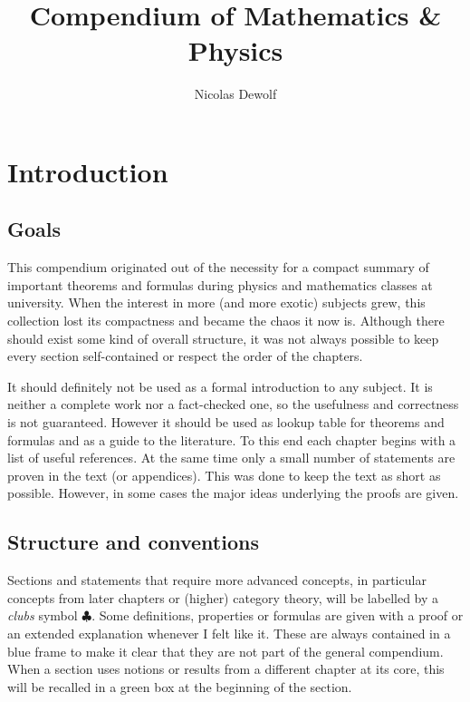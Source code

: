 \documentclass[11pt, a4paper]{report}
\begin{document}
\title{Compendium of Mathematics \& Physics}
\author{Nicolas Dewolf}
\maketitle

\tableofcontents

\chapter{Introduction}
\section{Goals}

    This compendium originated out of the necessity for a compact summary of important theorems and formulas during physics and mathematics classes at university. When the interest in more (and more exotic) subjects grew, this collection lost its compactness and became the chaos it now is. Although there should exist some kind of overall structure, it was not always possible to keep every section self-contained or respect the order of the chapters.

    It should definitely not be used as a formal introduction to any subject. It is neither a complete work nor a fact-checked one, so the usefulness and correctness is not guaranteed. However it should be used as lookup table for theorems and formulas and as a guide to the literature. To this end each chapter begins with a list of useful references. At the same time only a small number of statements are proven in the text (or appendices). This was done to keep the text as short as possible. However, in some cases the major ideas underlying the proofs are given.

\section{Structure and conventions}

    Sections and statements that require more advanced concepts, in particular concepts from later chapters or (higher) category theory, will be labelled by a \textit{clubs} symbol $\clubsuit$. Some definitions, properties or formulas are given with a proof or an extended explanation whenever I felt like it. These are always contained in a blue frame to make it clear that they are not part of the general compendium. When a section uses notions or results from a different chapter at its core, this will be recalled in a green box at the beginning of the section.
\end{document}
